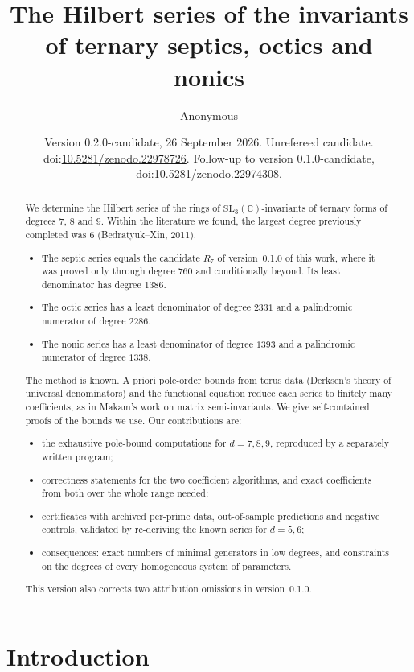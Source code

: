 \documentclass[11pt]{amsart}
\title[Hilbert series of ternary septic, octic and nonic invariants]{The Hilbert series of the invariants of ternary septics, octics and nonics}
\author{Anonymous}
\date{Version 0.2.0-candidate, 26 September 2026. Unrefereed candidate. doi:\href{https://doi.org/10.5281/zenodo.22978726}{10.5281/zenodo.22978726}. Follow-up to version 0.1.0-candidate, doi:\href{https://doi.org/10.5281/zenodo.22974308}{10.5281/zenodo.22974308}.}
\theoremstyle{definition}
\theoremstyle{remark}
\newcommand{\C}{\mathbb{C}}
\newcommand{\SL}{\mathrm{SL}}
\begin{document}
\begin{abstract}
We determine the Hilbert series of the rings of $\SL_3(\C)$-invariants of ternary forms of degrees $7$, $8$ and $9$. Within the literature we found, the largest degree previously completed was $6$ (Bedratyuk--Xin, 2011).
\begin{itemize}
\item The septic series equals the candidate $R_7$ of version~0.1.0 of this work, where it was proved only through degree $760$ and conditionally beyond. Its least denominator has degree $1386$.
\item The octic series has a least denominator of degree $2331$ and a palindromic numerator of degree $2286$.
\item The nonic series has a least denominator of degree $1393$ and a palindromic numerator of degree $1338$.
\end{itemize}

The method is known. A priori pole-order bounds from torus data (Derksen's theory of universal denominators) and the functional equation reduce each series to finitely many coefficients, as in Makam's work on matrix semi-invariants. We give self-contained proofs of the bounds we use. Our contributions are:
\begin{itemize}
\item the exhaustive pole-bound computations for $d=7,8,9$, reproduced by a separately written program;
\item correctness statements for the two coefficient algorithms, and exact coefficients from both over the whole range needed;
\item certificates with archived per-prime data, out-of-sample predictions and negative controls, validated by re-deriving the known series for $d=5,6$;
\item consequences: exact numbers of minimal generators in low degrees, and constraints on the degrees of every homogeneous system of parameters.
\end{itemize}
This version also corrects two attribution omissions in version~0.1.0.
\end{abstract}

\maketitle

\section{Introduction}
\end{document}
